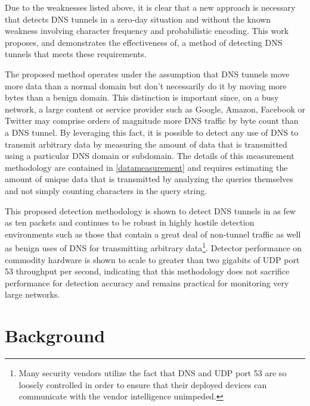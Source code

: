 \documentclass[12pt]{article}
\theoremstyle{remark}
\theoremstyle{definition}
\theoremstyle{definition}
\theoremstyle{definition}
\begin{document}
Due to the weaknesses listed above, it is clear that a new approach is
necessary that detects DNS tunnels in a zero-day situation and without the known 
weakness involving character frequency and probabilistic encoding. This work
proposes, and demonstrates the effectiveness of, a method of detecting DNS
tunnels that meets these requirements.

The proposed method operates under the assumption that DNS tunnels move more
data than a normal domain but don't necessarily do it by moving more bytes than
a benign domain. This distinction is important since, on a busy network, a large
content or service provider such as Google, Amazon, Facebook or Twitter may
comprise orders of magnitude more DNS traffic by byte count than a DNS tunnel.
By leveraging this fact, it is possible to detect
any use of DNS to transmit arbitrary data by measuring the amount of data that
is transmitted using a particular DNS domain or subdomain. The details of this
measurement methodology are contained in \ref{datameasurement} and requires
estimating the amount of unique data that is transmitted by analyzing the
queries themselves and not simply counting characters in the query string.

This proposed detection methodology is shown to detect DNS tunnels in as few as
ten packets and continues to be robust in highly hostile detection environments
such as those that contain a great deal of non-tunnel traffic as well as benign
uses of DNS for transmitting arbitrary data\footnote{Many security vendors
utilize the fact that DNS and UDP port 53 are so loosely controlled in order to
ensure that their deployed devices can communicate with the vendor intelligence
unimpeded.}. Detector performance on commodity hardware is shown to scale to
greater than two gigabits of UDP port 53 throughput per second, indicating that
this methodology does not sacrifice performance for detection accuracy and
remains practical for monitoring very large networks.

\newpage

\section{Background}
\end{document}
